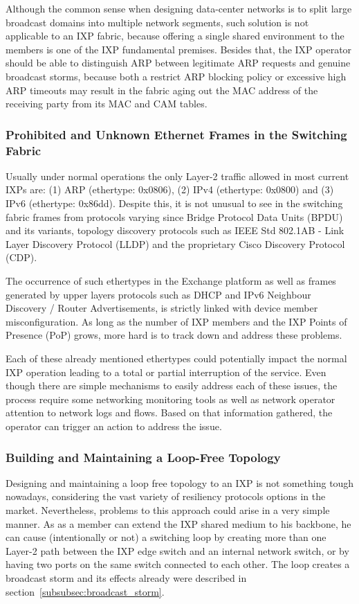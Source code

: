 Although the common sense when designing data-center networks is to split large broadcast domains into multiple network segments, such solution is not applicable to an IXP fabric, because offering a single shared environment to the members is one of the IXP fundamental premises. Besides that, the IXP operator should be able to distinguish ARP between legitimate ARP requests and genuine broadcast storms, because both a restrict ARP blocking policy or excessive high ARP timeouts may result in the fabric aging out the MAC address of the receiving party from its MAC and CAM tables.

\subsubsection{Prohibited and Unknown Ethernet Frames in the Switching Fabric}
Usually under normal operations the only Layer-2 traffic allowed in most current IXPs are: (1) ARP (ethertype: 0x0806), (2) IPv4 (ethertype: 0x0800) and (3) IPv6 (ethertype: 0x86dd). Despite this, it is not unusual to see in the switching fabric frames from protocols varying since Bridge Protocol Data Units (BPDU) and its variants, topology discovery protocols such as IEEE Std 802.1AB - Link Layer Discovery Protocol (LLDP) and the proprietary Cisco Discovery Protocol (CDP). 

The occurrence of such ethertypes in the Exchange platform as well as frames generated by upper layers protocols such as DHCP and IPv6 Neighbour Discovery / Router Advertisements, is strictly linked with device member misconfiguration. As long as the number of IXP members and the IXP Points of Presence (PoP) grows, more hard is to track down and address these problems. 

Each of these already mentioned ethertypes could potentially impact the normal IXP operation leading to a total or partial interruption of the service. Even though there are simple mechanisms to easily address each of these issues, the process require some networking monitoring tools as well as network operator attention to network logs and flows. Based on that information gathered, the operator can trigger an action to address the issue. 

\subsubsection{Building and Maintaining a Loop-Free Topology}
Designing and maintaining a loop free topology to an IXP is not something tough nowadays, considering the vast variety of resiliency protocols options in the market. Nevertheless, problems to this approach could arise in a very simple manner. As as a member can extend the IXP shared medium to his backbone, he can cause (intentionally or not) a switching loop by creating more than one Layer-2 path between the IXP edge switch and an internal network switch, or by having two ports on the same switch connected to each other. The loop creates a broadcast storm and its effects already were described in section~\ref{subsubsec:broadcast_storm}.

